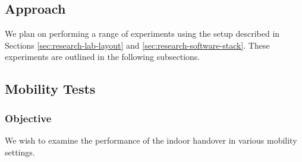 \subsection{Approach}
We plan on performing a range of experiments using the setup described in Sections \ref{sec:research-lab-layout} and \ref{sec:research-software-stack}. These experiments are outlined in the following subsections.

\subsection{Mobility Tests}
\label{sec:exp:real:mobile}
\subsubsection{Objective}
We wish to examine the performance of the indoor handover in various mobility settings.
